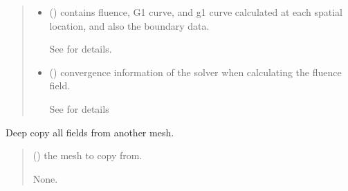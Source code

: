 \documentclass[letterpaper,10pt,english]{sphinxmanual}
\begin{document}
\begin{fulllineitems}
\begin{fulllineitems}
\begin{quote}
\begin{description}
\sphinxAtStartPar
\begin{itemize}
\item {} 
\sphinxAtStartPar
{} () \textendash{} contains fluence, G1 curve, and g1 curve calculated at each spatial location, and also the boundary data.

\sphinxAtStartPar
See {\hyperref[\detokenize{_autosummary/nirfasterff.base.data.DCSdata:nirfasterff.base.data.DCSdata}]{}} for details.

\item {} 
\sphinxAtStartPar
{} () \textendash{} convergence information of the solver when calculating the fluence field.

\sphinxAtStartPar
See {\hyperref[\detokenize{_autosummary/nirfasterff.utils.ConvergenceInfo:nirfasterff.utils.ConvergenceInfo}]{}} for details

\end{itemize}


\end{description}\end{quote}

\end{fulllineitems}


\begin{fulllineitems}
\label{\detokenize{_autosummary/nirfasterff.base.dcs_mesh.dcsmesh:nirfasterff.base.dcs_mesh.dcsmesh.from_copy}}
\pysigstartsignatures
{}
\pysigstopsignatures
\sphinxAtStartPar
Deep copy all fields from another mesh.
\begin{quote}\begin{description}
\sphinxAtStartPar
{} () \textendash{} the mesh to copy from.

\sphinxAtStartPar
None.

\end{description}\end{quote}


\end{fulllineitems}
\end{fulllineitems}
\end{document}
